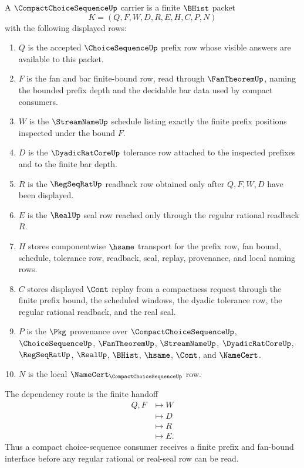 \begin{definition}
\label{def:compact-choice-sequence-carrier}
A $\CompactChoiceSequenceUp$ carrier is a finite $\BHist$ packet
$$
K=(Q,F,W,D,R,E,H,C,P,N)
$$
with the following displayed rows:
\begin{enumerate}
\item $Q$ is the accepted $\ChoiceSequenceUp$ prefix row whose visible answers are available to this packet.
\item $F$ is the fan and bar finite-bound row, read through $\FanTheoremUp$, naming the bounded prefix depth and the decidable bar data used by compact consumers.
\item $W$ is the $\StreamNameUp$ schedule listing exactly the finite prefix positions inspected under the bound $F$.
\item $D$ is the $\DyadicRatCoreUp$ tolerance row attached to the inspected prefixes and to the finite bar depth.
\item $R$ is the $\RegSeqRatUp$ readback row obtained only after $Q,F,W,D$ have been displayed.
\item $E$ is the $\RealUp$ seal row reached only through the regular rational readback $R$.
\item $H$ stores componentwise $\hsame$ transport for the prefix row, fan bound, schedule, tolerance row, readback, seal, replay, provenance, and local naming rows.
\item $C$ stores displayed $\Cont$ replay from a compactness request through the finite prefix bound, the scheduled windows, the dyadic tolerance row, the regular rational readback, and the real seal.
\item $P$ is the $\Pkg$ provenance over $\CompactChoiceSequenceUp$, $\ChoiceSequenceUp$, $\FanTheoremUp$, $\StreamNameUp$, $\DyadicRatCoreUp$, $\RegSeqRatUp$, $\RealUp$, $\BHist$, $\hsame$, $\Cont$, and $\NameCert$.
\item $N$ is the local $\NameCert_{\CompactChoiceSequenceUp}$ row.
\end{enumerate}
The dependency route is the finite handoff
$$
\begin{aligned}
Q,F
&\longmapsto W\\
&\longmapsto D\\
&\longmapsto R\\
&\longmapsto E .
\end{aligned}
$$
Thus a compact choice-sequence consumer receives a finite prefix and fan-bound interface before any regular rational or real-seal row can be read.
\end{definition}

